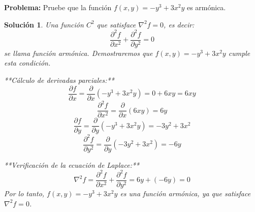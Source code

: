 \documentclass{article}
\theoremstyle{nonumberplain}
\newtheorem{solucion}{Solución}
\begin{document}
\textbf{Problema:} Pruebe que la función \( f(x, y) = -y^3 + 3x^2y \) es armónica. \\

\begin{solucion}
Una función \( C^2 \) que satisface \( \nabla^2 f = 0 \), es decir:
\[
\frac{\partial^2 f}{\partial x^2} + \frac{\partial^2 f}{\partial y^2} = 0
\]
se llama función armónica. Demostraremos que \( f(x, y) = -y^3 + 3x^2y \) cumple esta condición.

**Cálculo de derivadas parciales:**
\[
\frac{\partial f}{\partial x} = \frac{\partial}{\partial x} \left(-y^3 + 3x^2y\right) = 0 + 6xy = 6xy
\]
\[
\frac{\partial^2 f}{\partial x^2} = \frac{\partial}{\partial x} \left(6xy\right) = 6y
\]
\[
\frac{\partial f}{\partial y} = \frac{\partial}{\partial y} \left(-y^3 + 3x^2y\right) = -3y^2 + 3x^2
\]
\[
\frac{\partial^2 f}{\partial y^2} = \frac{\partial}{\partial y} \left(-3y^2 + 3x^2\right) = -6y
\]

**Verificación de la ecuación de Laplace:**
\[
\nabla^2 f = \frac{\partial^2 f}{\partial x^2} + \frac{\partial^2 f}{\partial y^2} = 6y + (-6y) = 0
\]
Por lo tanto, \( f(x, y) = -y^3 + 3x^2y \) es una función armónica, ya que satisface \( \nabla^2 f = 0 \).

\end{solucion}
\end{document}
